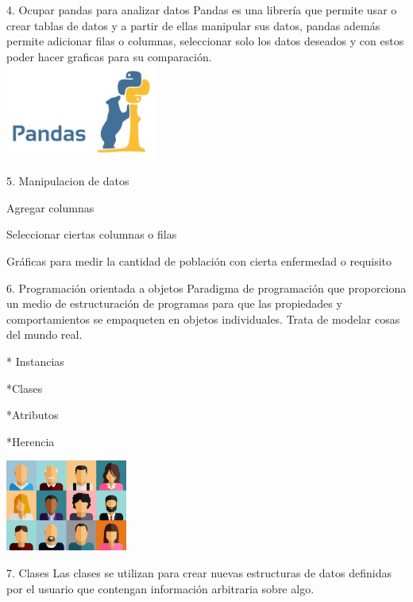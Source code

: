 \documentclass[10pt]{beamer}
\begin{document}
\begin{frame}{4. Ocupar pandas para analizar datos}
Pandas es una librería que permite usar o crear tablas de datos y a partir de ellas manipular sus datos, pandas además permite adicionar filas o columnas, seleccionar solo los datos deseados y con estos poder hacer graficas para su comparación. \\
\centering
\includegraphics[width=5cm]{pandas.jpg}
\end{frame}


\begin{frame}{5. Manipulacion de datos}

Agregar columnas

Seleccionar ciertas columnas o filas

Gráficas para medir la cantidad de población con cierta enfermedad o requisito

\end{frame}

\begin{frame}{6. Programación orientada a objetos}
Paradigma de programación que proporciona un medio de estructuración de programas para que las propiedades y comportamientos se empaqueten en objetos individuales.
Trata de modelar cosas del mundo real. 

* Instancias

*Clases

*Atributos

*Herencia


\centering
\includegraphics[width=4cm]{Post-Persona.jpg}
\end{frame}

\begin{frame}{7. Clases }
Las clases se utilizan para crear nuevas estructuras de datos definidas por el usuario que contengan información arbitraria sobre algo. 


\end{frame}
\end{document}
